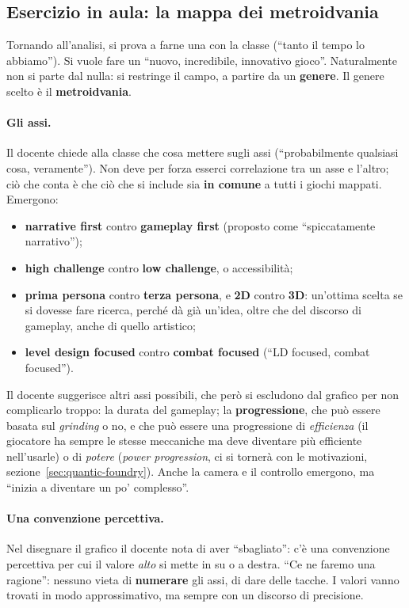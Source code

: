 \subsection{Esercizio in aula: la mappa dei metroidvania}

Tornando all'analisi, si prova a farne una con la classe (``tanto il tempo lo
abbiamo''). Si vuole fare un ``nuovo, incredibile, innovativo gioco''.
Naturalmente non si parte dal nulla: si restringe il campo, a partire da un
\textbf{genere}. Il genere scelto è il \textbf{metroidvania}.

\paragraph{Gli assi.} Il docente chiede alla classe che cosa mettere sugli
assi (``probabilmente qualsiasi cosa, veramente''). Non deve per forza esserci
correlazione tra un asse e l'altro; ciò che conta è che ciò che si include
sia \textbf{in comune} a tutti i giochi mappati. Emergono:
\begin{itemize}
  \item \textbf{narrative first} contro \textbf{gameplay first} (proposto
        come ``spiccatamente narrativo'');
  \item \textbf{high challenge} contro \textbf{low challenge}, o
        accessibilità;
  \item \textbf{prima persona} contro \textbf{terza persona}, e \textbf{2D}
        contro \textbf{3D}: un'ottima scelta se si dovesse fare ricerca,
        perché dà già un'idea, oltre che del discorso di gameplay, anche di
        quello artistico;
  \item \textbf{level design focused} contro \textbf{combat focused} (``LD
        focused, combat focused'').
\end{itemize}
Il docente suggerisce altri assi possibili, che però si escludono dal grafico
per non complicarlo troppo: la durata del gameplay; la \textbf{progressione},
che può essere basata sul \emph{grinding} o no, e che può essere una
progressione di \emph{efficienza} (il giocatore ha sempre le stesse meccaniche
ma deve diventare più efficiente nell'usarle) o di \emph{potere} (\emph{power
progression}, ci si tornerà con le motivazioni,
sezione~\ref{sec:quantic-foundry}). Anche la camera e il controllo
emergono, ma ``inizia a diventare un po' complesso''.

\paragraph{Una convenzione percettiva.} Nel disegnare il grafico il docente
nota di aver ``sbagliato'': c'è una convenzione percettiva per cui il valore
\emph{alto} si mette in su o a destra. ``Ce ne faremo una ragione'': nessuno
vieta di \textbf{numerare} gli assi, di dare delle tacche. I valori vanno
trovati in modo approssimativo, ma sempre con un discorso di precisione.

